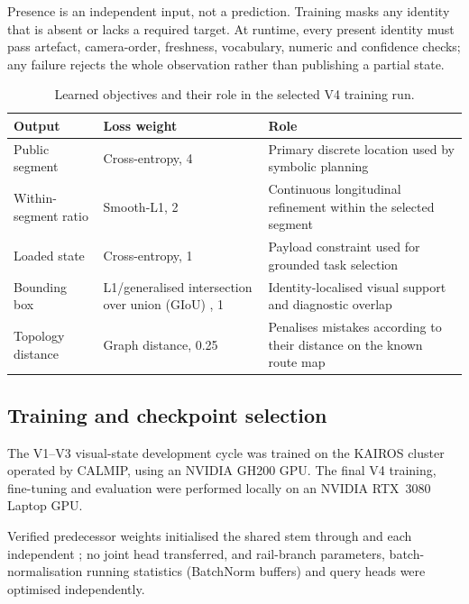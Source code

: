 Presence is an independent input, not a prediction. Training masks any identity
that is absent or lacks a required target. At runtime, every present identity
must pass artefact, camera-order, freshness, vocabulary, numeric and confidence
checks; any failure rejects the whole observation rather than publishing a
partial state.

\begin{table}[htbp]
\centering
\small
\setlength{\tabcolsep}{4pt}
\caption{Learned objectives and their role in the selected V4 training run.}
\label{tab:visual-training-objectives}
\begin{tabularx}{\textwidth}{@{}
>{\raggedright\arraybackslash}p{}
>{\raggedright\arraybackslash}p{}
>{\raggedright\arraybackslash}X@{}}
\toprule
\textbf{Output} & \textbf{Loss weight} & \textbf{Role}\\
\midrule
Public segment & Cross-entropy, 4 & Primary discrete location used by symbolic
planning\\ \tablerowrule
Within-segment ratio & Smooth-L1, 2 & Continuous longitudinal refinement within
the selected segment\\ \tablerowrule
Loaded state & Cross-entropy, 1 & Payload constraint used for grounded task
selection\\ \tablerowrule
Bounding box & L1/generalised intersection over union (GIoU)
\citep{giou}, 1 &
Identity-localised visual support and diagnostic overlap\\ \tablerowrule
Topology distance & Graph distance, 0.25 & Penalises mistakes according to their
distance on the known route map\\
\bottomrule
\end{tabularx}
\end{table}

\subsection{Training and checkpoint selection}

The V1--V3 visual-state development cycle was trained on the KAIROS cluster
operated by CALMIP, using an NVIDIA GH200 GPU. The final V4 training,
fine-tuning and evaluation were performed locally on an NVIDIA RTX~3080 Laptop
GPU.

Verified predecessor weights initialised the shared stem through 
and each independent ; no joint head transferred, and rail-branch
parameters, batch-normalisation running statistics (BatchNorm buffers) and
query heads were optimised independently.

